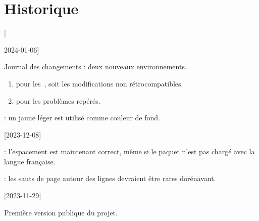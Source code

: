 \section{Historique}

[


2024-01-06]

\begin{tdocnew}
	\item Journal des changements : deux nouveaux environnements.
    \begin{enumerate}
        \item {} pour les \,, soit les modifications non rétrocompatibles.

        \item {} pour les problèmes repérés.
    \end{enumerate}

	\item {}: un jaune léger est utilisé comme couleur de fond.
\end{tdocnew}

\tdocsep

[2023-12-08]

\begin{tdocfix}
	\item {}: l'espacement est maintenant correct, même si le paquet  n'est pas chargé avec la langue française.

	\item {}: les sauts de page autour des lignes  devraient être rares dorénavant.
\end{tdocfix}

\tdocsep

[2023-11-29]

Première version publique du projet.


